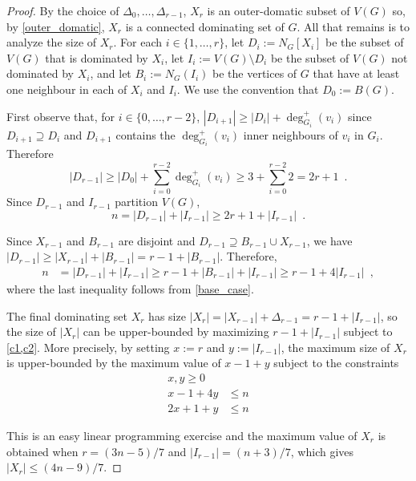 \documentclass{article}
\theoremstyle{definition}
\begin{document}
\begin{proof}
By the choice of $\Delta_0,\ldots,\Delta_{r-1}$, $X_r$ is an outer-domatic subset of $V(G)$ so, by \cref{outer_domatic}, $X_r$ is a connected dominating set of $G$.  All that remains is to analyze the size of $X_r$.  For each $i\in\{1,\ldots,r\}$, let $D_i:=N_G[X_i]$ be the subset of $V(G)$ that is dominated by $X_i$, let $I_i:=V(G)\setminus D_i$ be the subset of $V(G)$ not dominated by $X_i$, and let $B_i:=N_G(I_i)$ be the vertices of $G$ that have at least one neighbour in each of $X_i$ and $I_i$.  We use the convention that $D_0:=B(G)$.

First observe that, for $i\in\{0,\ldots,r-2\}$, $|D_{i+1}|\ge |D_i|+\deg_{G_i}^+(v_i)$ since $D_{i+1}\supseteq D_i$ and $D_{i+1}$ contains the $\deg_{G_i}^+(v_i)$ inner neighbours of $v_i$ in $G_i$.  Therefore
\[
    |D_{r-1}| \ge |D_0| + \sum_{i=0}^{r-2} \deg_{G_i}^+(v_i) \ge 3 + \sum_{i=0}^{r-2} 2 =  2r+1 \enspace . \label{double_d}
\]
Since $D_{r-1}$ and $I_{r-1}$ partition $V(G)$,
\begin{equation}
  n = |D_{r-1}| + |I_{r-1}| \ge 2r+1 + |I_{r-1}|  \enspace . \label{c1}
\end{equation}

Since $X_{r-1}$ and $B_{r-1}$ are disjoint and $D_{r-1}\supseteq B_{r-1}\cup X_{r-1}$, we have $|D_{r-1}|\ge |X_{r-1}| + |B_{r-1}|=r-1+|B_{r-1}|$.  Therefore,
\begin{align}
    n & = |D_{r-1}| + |I_{r-1}| \ge r-1 + |B_{r-1}| + |I_{r-1}| \ge r - 1 + 4|I_{r-1}| \enspace , \label{c2}
\end{align}
where the last inequality follows from \cref{base_case}.

The final dominating set $X_r$ has size $|X_r| = |X_{r-1}| + \Delta_{r-1} = r - 1 +|I_{r-1}|$, so the size of $|X_r|$ can be upper-bounded by maximizing $r-1+|I_{r-1}|$ subject to \cref{c1,c2}.  More precisely, by setting $x:=r$ and $y:=|I_{r-1}|$, the maximum size of $X_r$ is upper-bounded by the maximum value of $x-1+y$ subject to the constraints
\begin{align*}
x,y \ge 0 \\
  x - 1 + 4y & \le n \\
  2x + 1 + y & \le n
\end{align*}

This is an easy linear programming exercise and the maximum value of $X_{r}$ is obtained when $r=(3n-5)/7$ and $|I_{r-1}|=(n+3)/7$, which gives
$|X_r| \le (4n-9)/7$.
\end{proof}
\end{document}
